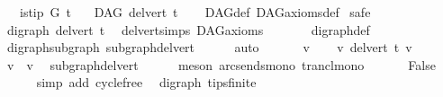 \begin{isabellebody}
\ \ \ {\isachardoublequoteopen}is{\isacharunderscore}{\kern0pt}tip\ G\ t{\isachardoublequoteclose}\isanewline
\ \ \ {\isachardoublequoteopen}DAG\ {\isacharparenleft}{\kern0pt}del{\isacharunderscore}{\kern0pt}vert\ t{\isacharparenright}{\kern0pt}{\isachardoublequoteclose}\isanewline
%
\isadelimproof
\ \ %
\endisadelimproof
%
\isatagproof
{}\isamarkupfalse%
\ DAG{\isacharunderscore}{\kern0pt}def\ DAG{\isacharunderscore}{\kern0pt}axioms{\isacharunderscore}{\kern0pt}def\isanewline
{}\isamarkupfalse%
\ safe\isanewline
\ \ \isamarkupfalse%
\ {\isachardoublequoteopen}digraph\ {\isacharparenleft}{\kern0pt}del{\isacharunderscore}{\kern0pt}vert\ t{\isacharparenright}{\kern0pt}{\isachardoublequoteclose}\ \isamarkupfalse%
\ del{\isacharunderscore}{\kern0pt}vert{\isacharunderscore}{\kern0pt}simps\ DAG{\isacharunderscore}{\kern0pt}axioms\ \isanewline
\ \ \ \ \ \ digraph{\isacharunderscore}{\kern0pt}def\isanewline
\ \ \ \ \isamarkupfalse%
\ digraph{\isacharunderscore}{\kern0pt}subgraph\ subgraph{\isacharunderscore}{\kern0pt}del{\isacharunderscore}{\kern0pt}vert\isanewline
\ \ \ \ \isamarkupfalse%
\ auto\ \isanewline
{}\isamarkupfalse%
\ \isanewline
\ \ \isamarkupfalse%
\ v\isanewline
\ \ \isamarkupfalse%
\ {\isachardoublequoteopen}v\ {\isasymrightarrow}\isactrlsup {\isacharplus}{\kern0pt}\isactrlbsub del{\isacharunderscore}{\kern0pt}vert\ t\isactrlesub \ v{\isachardoublequoteclose}\isanewline
\ \ \isamarkupfalse%
\ \isamarkupfalse%
\ {\isachardoublequoteopen}v\ {\isasymrightarrow}\isactrlsup {\isacharplus}{\kern0pt}\ v{\isachardoublequoteclose}\ \isamarkupfalse%
\ subgraph{\isacharunderscore}{\kern0pt}del{\isacharunderscore}{\kern0pt}vert\isanewline
\ \ \ \ \isamarkupfalse%
\ {\isacharparenleft}{\kern0pt}meson\ arcs{\isacharunderscore}{\kern0pt}ends{\isacharunderscore}{\kern0pt}mono\ trancl{\isacharunderscore}{\kern0pt}mono{\isacharparenright}{\kern0pt}\ \isanewline
\ \ \isamarkupfalse%
\ \isamarkupfalse%
\ False\isanewline
\ \ \ \ \isamarkupfalse%
\ {\isacharparenleft}{\kern0pt}simp\ add{\isacharcolon}{\kern0pt}\ cycle{\isacharunderscore}{\kern0pt}free{\isacharparenright}{\kern0pt}\isanewline
{}\isamarkupfalse%
%
\endisatagproof
{\isafoldproof}%
%
\isadelimproof
\isanewline
%
\endisadelimproof
\isanewline
{}\isamarkupfalse%
\ {\isacharparenleft}{\kern0pt}\ digraph{\isacharparenright}{\kern0pt}\ tips{\isacharunderscore}{\kern0pt}finite{\isacharcolon}{\kern0pt}\isanewline

\end{isabellebody}
